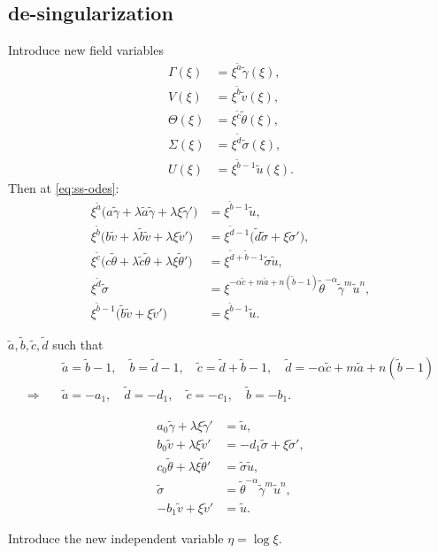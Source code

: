 \documentclass[a4paper,11pt]{article}
\def\tg{{\tilde{\gamma}}}
\def\tv{{\tilde{v}}}
\def\tth{{\tilde{\theta}}}
\def\ts{{\tilde{\sigma}}}
\def\tu{{\tilde{u}}}
\def\ta{{\tilde{a}}}
\def\tb{{\tilde{b}}}
\def\tc{{\tilde{c}}}
\def\td{{\tilde{d}}}
\begin{document}
\subsection{de-singularization}
Introduce new field variables 
\begin{equation}
\begin{aligned}
 \Gamma(\xi) &= \xi^\ta \tg(\xi),\\
 V(\xi)&=\xi^\tb \tv(\xi),\\
 \Theta(\xi)&=\xi^\tc \tth(\xi),\\
 \Sigma(\xi)&=\xi^\td \ts(\xi),\\
 U(\xi)&=\xi^{\tb-1} \tu(\xi). 
\end{aligned}
\end{equation}
Then at \eqref{eq:ss-odes}:
\begin{align*}
 \xi^\ta\Big( a\tg + \lambda \ta \tg + \lambda\xi\tg'\Big) &=\xi^{\tb-1} \tu,\\
 \xi^\tb\Big( b\tv + \lambda \tb \tv + \lambda\xi\tv'\Big) &=\xi^{\td-1} \Big(\td\ts + \xi\ts'\Big),\\
 \xi^\tc\Big( c\tth+ \lambda \tc \tth+ \lambda\xi\tth'\Big)&=\xi^{\td+\tb-1} \ts\tu,\\
 \xi^\td\ts &= \xi^{-\alpha \tc +m\ta +n(\tb-1)} \tth^{-\alpha} \tg^m \tu^n,\\
 \xi^{\tb-1}\Big(\tb\tv + \xi \tv'\Big)&= \xi^{\tb-1} \tu.
\end{align*}

$\ta, \tb, \tc, \td$ such that
\begin{align*}
 &\ta=\tb-1, \quad \tb=\td-1, \quad \tc=\td+\tb-1,\quad \td = -\alpha \tc + m\ta +n(\tb-1) \\
 \Longrightarrow \quad&\ta = -a_1, \quad \td = -d_1, \quad \tc = -c_1, \quad \tb=-b_1.
\end{align*}

\begin{equation} \label{eq:tildesys}
 \begin{aligned}
  a_0\tg + \lambda\xi\tg' &=\tu,\\
  b_0\tv + \lambda\xi\tv' &=-d_1 \ts + \xi\ts',\\
  c_0\tth+ \lambda\xi\tth'&=\ts\tu,\\
  \ts &=\tth^{-\alpha}\tg^m\tu^n,\\
  -b_1\tv+\xi\tv' &= \tu.
 \end{aligned}
\end{equation}

Introduce the new independent variable $\eta = \log\xi$.
\end{document}
